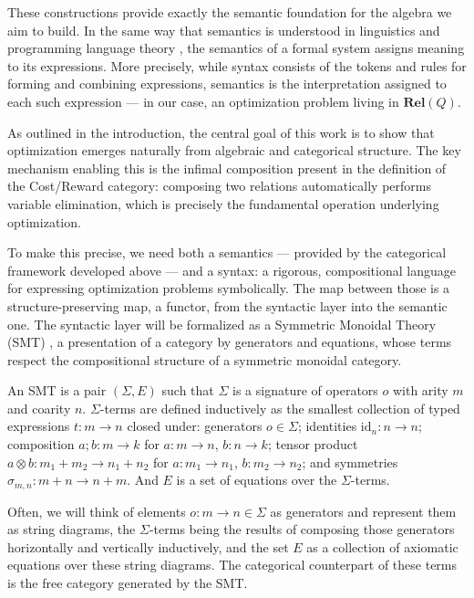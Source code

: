 These constructions provide exactly the semantic foundation for the algebra we aim to build. In the same way that semantics is understood in linguistics and programming language theory \cite{winskel1993formal}, the semantics of a formal system assigns meaning to its expressions. More precisely, while syntax consists of the tokens and rules for forming and combining expressions, semantics is the interpretation assigned to each such expression --- in our case, an optimization problem living in $\mathbf{Rel}(Q)$.

As outlined in the introduction, the central goal of this work is to show that optimization emerges naturally from algebraic and categorical structure.
The key mechanism enabling this is the infimal composition present in the definition of the Cost/Reward category: composing two relations automatically performs variable elimination, which is precisely the fundamental operation underlying optimization.

To make this precise, we need both a semantics --- provided by the categorical framework developed above --- and a syntax: a rigorous, compositional language for expressing optimization problems symbolically.
The map between those is a structure-preserving map, a functor, from the syntactic layer into the semantic one.
The syntactic layer will be formalized as a Symmetric Monoidal Theory (SMT) \cite{bonchi2017interacting}, a presentation of a category by generators and equations, whose terms respect the compositional structure of a symmetric monoidal category.

\begin{definition}
	An SMT is a pair $(\Sigma,E)$ such that $\Sigma$ is a signature of operators $o$ with arity $m$ and coarity $n$.
	$\Sigma$-terms are defined inductively as the smallest collection of
	typed expressions $t : m \to n$ closed under: generators $o \in \Sigma$;
	identities $\mathrm{id}_n : n \to n$; composition $a;b : m\to k$ for $a:m\to n$, $b:n\to k$;
	tensor product $a \otimes b : m_1+m_2 \to n_1+n_2$ for $a:m_1\to n_1$, $b:m_2\to n_2$;
	and symmetries $\sigma_{m,n} : m+n \to n+m$.
	And $E$ is a set of equations over the $\Sigma$-terms.
\end{definition}

Often, we will think of elements $o:m\to n \in \Sigma$ as generators and represent them as string diagrams, the $\Sigma$-terms being the results of composing those generators horizontally and vertically inductively, and the set $E$ as a collection of axiomatic equations over these string diagrams. The categorical counterpart of these terms is the free category generated by the SMT.

